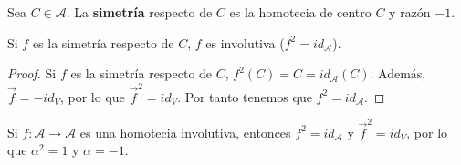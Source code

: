 \begin{fdefinition}[Simetría]
\normalfont Sea $\displaystyle C \in \mathcal{A} $. La \textbf{simetría} respecto de $\displaystyle C $ es la homotecia de centro $\displaystyle C $ y razón $\displaystyle -1 $. 
\end{fdefinition}
\begin{fprop}[]
\normalfont 
Si $\displaystyle f $ es la simetría respecto de $\displaystyle C $, $\displaystyle f $ es involutiva ($\displaystyle f^{2} = id _{\mathcal{A}} $).
\end{fprop}
\begin{proof}
Si $\displaystyle f $ es la simetría respecto de $\displaystyle C $, $\displaystyle f^{2}\left(C\right) = C = id _{\mathcal{A}}\left(C\right) $.
Además, $\displaystyle \vec{f} = - id _{V} $, por lo que $\displaystyle \vec{f}^{2} = id _{V} $. Por tanto tenemos que $\displaystyle f^{2} = id _{\mathcal{A}} $.
\end{proof}
\begin{observation}
\normalfont Si $\displaystyle f : \mathcal{A} \to \mathcal{A} $ es una homotecia involutiva, entonces $\displaystyle f^{2} = id _{\mathcal{A}} $ y $\displaystyle \vec{f}^{2} = id _{V} $, por lo que $\displaystyle \alpha^{2} = 1 $ y $\displaystyle \alpha = -1 $.
\end{observation}
